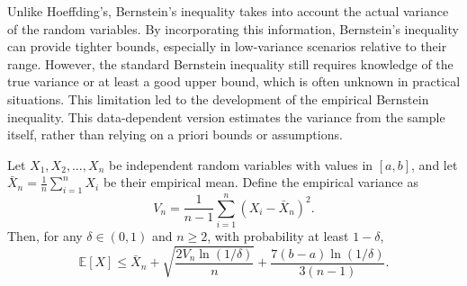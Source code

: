 Unlike Hoeffding's, Bernstein's inequality takes into account the actual variance of the random variables.
By incorporating this information, Bernstein's inequality can provide tighter bounds, especially in low-variance scenarios relative to their range.
However, the standard Bernstein inequality still requires knowledge of the true variance or at least a good upper bound, which is often unknown in practical situations.
This limitation led to the development of the empirical Bernstein inequality.
This data-dependent version estimates the variance from the sample itself, rather than relying on a priori bounds or assumptions.
\begin{proposition}
    \label{prop:empirical-bernstein-inequality}
    Let $X_1, X_2, \ldots, X_n$ be independent random variables with values in $[a,b]$, and let $\bar{X}_n = \frac{1}{n}\sum_{i=1}^n X_i$ be their empirical mean.
    Define the empirical variance as
    \[
        V_n = \frac{1}{n-1} \sum_{i=1}^n (X_i - \bar{X}_n)^2.
    \]
    Then, for any $\delta \in (0,1)$ and $n \geq 2$, with probability at least $1-\delta$,
    \[
        \mathbb{E}[X] \leq \bar{X}_n + \sqrt{\frac{2V_n \ln(1/\delta)}{n}} + \frac{7(b-a)\ln(1/\delta)}{3(n-1)}.
    \]
\end{proposition}
%
%
